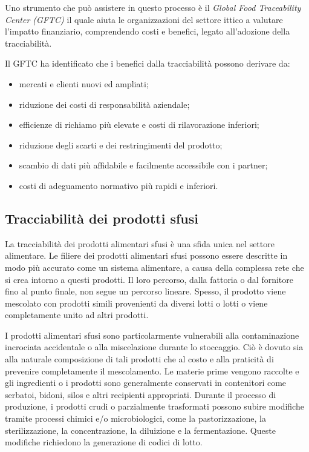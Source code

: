 Uno strumento che può assistere in questo processo è il \textit{Global Food Traceability Center (GFTC)} il quale aiuta le organizzazioni del settore ittico a valutare l'impatto finanziario, comprendendo costi e benefici, legato all'adozione della tracciabilità.

Il GFTC ha identificato che i benefici dalla tracciabilità possono derivare da:

\begin{itemize}
    \item mercati e clienti nuovi ed ampliati;
    \item riduzione dei costi di responsabilità aziendale;
    \item efficienze di richiamo più elevate e costi di rilavorazione inferiori;
    \item riduzione degli scarti e dei restringimenti del prodotto;
    \item scambio di dati più affidabile e facilmente accessibile con i partner;
    \item costi di adeguamento normativo più rapidi e inferiori.
\end{itemize}

\subsection{Tracciabilità dei prodotti sfusi}

La tracciabilità dei prodotti alimentari sfusi è una sfida unica nel settore alimentare. Le filiere dei prodotti alimentari sfusi possono essere descritte in modo più accurato come un sistema alimentare, a causa della complessa rete che si crea intorno a questi prodotti. Il loro percorso, dalla fattoria o dal fornitore fino al punto finale, non segue un percorso lineare. Spesso, il prodotto viene mescolato con prodotti simili provenienti da diversi lotti o lotti o viene completamente unito ad altri prodotti.

I prodotti alimentari sfusi sono particolarmente vulnerabili alla contaminazione incrociata accidentale o alla miscelazione durante lo stoccaggio. Ciò è dovuto sia alla naturale composizione di tali prodotti che al costo e alla praticità di prevenire completamente il mescolamento. Le materie prime vengono raccolte e gli ingredienti o i prodotti sono generalmente conservati in contenitori come serbatoi, bidoni, silos e altri recipienti appropriati. Durante il processo di produzione, i prodotti crudi o parzialmente trasformati possono subire modifiche tramite processi chimici e/o microbiologici, come la pastorizzazione, la sterilizzazione, la concentrazione, la diluizione e la fermentazione. Queste modifiche richiedono la generazione di codici di lotto.

